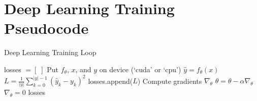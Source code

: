 \documentclass{article}
\theoremstyle{plain2}
\begin{document}
\section*{Deep Learning Training Pseudocode}

\begin{algorithm}[H]
\caption{Deep Learning Training Loop}
\begin{algorithmic}
    \State losses $= [ \; ]$
    \State Put $f_{\theta}$, $x$, and $y$ on device (`cuda' or `cpu')
        \State $\hat{y} = f_{\theta}(x)$ 
        \State $L = \frac{1}{\lvert y \rvert} \sum_{k=0}^{\lvert y \rvert - 1} (\hat{y}_k - y_k)^2$ 
        \State losses.append($L$)
        \State Compute gradients $\nabla_{\theta}$ 
        \State $\theta = \theta - \alpha \nabla_{\theta}$ 
        \State $\nabla_{\theta} = 0$ 
    \EndFor
    \State \Return losses
\EndProcedure
\end{algorithmic}
\end{algorithm}
\end{document}
